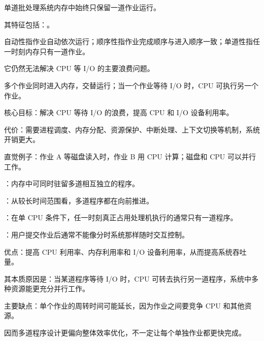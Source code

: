 \begin{points}
  \item 单道批处理系统内存中始终只保留一道作业运行。
  \item 其特征包括：。
  \item 自动性指作业自动依次运行；顺序性指作业完成顺序与进入顺序一致；单道性指任一时刻内存只有一道作业。
  \item 它仍然无法解决 CPU 等 I/O 的主要浪费问题。
\end{points}


\begin{points}
  \item 多个作业同时进入内存，交替运行；当一个作业等待 I/O 时，CPU 可执行另一个作业。
  \item 核心目标：解决 CPU 等待 I/O 的浪费，提高 CPU 和 I/O 设备利用率。
  \item 代价：需要进程调度、内存分配、资源保护、中断处理、上下文切换等机制，系统开销更大。
  \item 直觉例子：作业 A 等磁盘读入时，作业 B 用 CPU 计算；磁盘和 CPU 可以并行工作。
\end{points}


\begin{points}
  \item {}：内存中可同时驻留多道相互独立的程序。
  \item {}：从较长时间范围看，多道程序都在向前推进。
  \item {}：在单 CPU 条件下，任一时刻真正占用处理机执行的通常只有一道程序。
  \item {}：用户提交作业后通常不能像分时系统那样随时交互控制。
\end{points}


\begin{points}
  \item 优点：提高 CPU 利用率、内存利用率和 I/O 设备利用率，从而提高系统吞吐量。
  \item 其本质原因是：当某道程序等待 I/O 时，CPU 可转去执行另一道程序，系统中多种资源能更充分并行工作。
  \item 主要缺点：单个作业的周转时间可能延长，因为作业之间要竞争 CPU 和其他资源。
  \item 因而多道程序设计更偏向整体效率优化，不一定让每个单独作业都更快完成。
\end{points}


